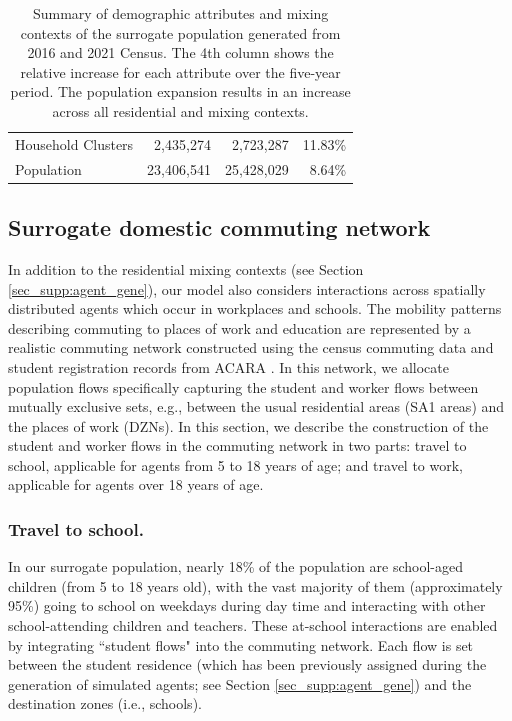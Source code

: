 \documentclass{article}
\begin{document}
\begin{appendices}
\begin{table}[ht]
\begin{tabular}{|l|r|r|r|}
Household Clusters & 2,435,274                                                           & 2,723,287                                                           & 11.83\%                                                                   \\ 
Population             & 23,406,541                                                          & 25,428,029                                                          & 8.64\%                                                                    \\ \hline
\end{tabular}
\caption{Summary of demographic attributes and mixing contexts of the surrogate population generated from 2016 and 2021 Census. The 4th column shows the relative increase for each  attribute over the five-year period. The population expansion results in an increase across all residential and mixing contexts.}
\label{tab:surrogate_pop_stats}
\end{table}

\subsection{Surrogate domestic commuting network}
\label{sec_supp:TTW}
In addition to the residential mixing contexts (see Section \ref{sec_supp:agent_gene}), our model also considers interactions across spatially distributed agents which occur in workplaces and schools. %
The mobility patterns describing commuting to places of work and education are represented by a realistic commuting network constructed using the census commuting data and student registration records from ACARA \cite{ACARA_Data}. In this network, we allocate population flows specifically capturing the student and worker flows between mutually exclusive sets, e.g., between the usual residential areas (SA1 areas) and the places of work (DZNs). In this section, we describe the construction of the student and worker flows in the commuting network in two parts: travel to school, applicable for agents from 5 to 18 years of age; and travel to work, applicable for agents over 18 years of age.

\subsubsection{Travel to school.}
In our surrogate population, nearly 18\%  of the population are school-aged children (from 5 to 18 years old), with the vast majority of them (approximately 95\%) going to school on weekdays during day time and interacting with other school-attending children and teachers. 
These at-school interactions are enabled by integrating ``student flows" into the commuting network. Each flow is set between the student residence (which has been previously assigned during the generation of simulated agents; see Section \ref{sec_supp:agent_gene}) and the destination zones (i.e., schools). 


\end{appendices}
\end{document}

